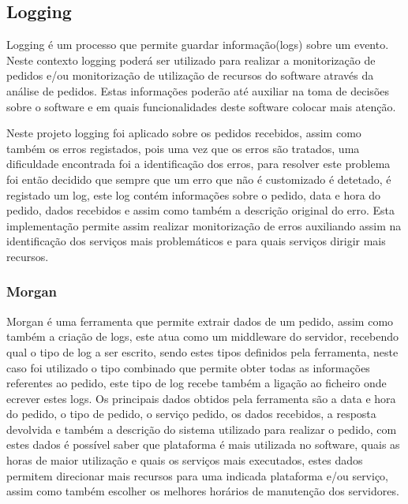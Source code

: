 \subsection{Logging}
Logging é um processo que permite guardar informação(logs) sobre um evento. Neste contexto logging poderá ser utilizado para realizar a monitorização de pedidos e/ou monitorização de utilização de recursos do software através da análise de pedidos. Estas informações poderão até auxiliar na toma de decisões sobre o software e em quais funcionalidades deste software colocar mais atenção.

Neste projeto logging foi aplicado sobre os pedidos recebidos, assim como também os erros registados, pois uma vez que os erros são tratados, uma dificuldade encontrada foi a identificação dos erros, para resolver este problema foi então decidido que sempre que um erro que não é customizado é detetado, é registado um log, este log contém informações sobre o pedido, data e hora do pedido, dados recebidos e assim como também a descrição original do erro. Esta implementação permite assim realizar monitorização de erros auxiliando assim na identificação dos serviços mais problemáticos e para quais serviços dirigir mais recursos.

\subsubsection{Morgan}
Morgan é uma ferramenta que permite extrair dados de um pedido, assim como também a criação de logs, 
este atua como um middleware do servidor, recebendo qual o tipo de log a ser escrito, sendo estes tipos definidos pela ferramenta, neste caso foi utilizado o tipo combinado que permite obter todas as informações referentes ao pedido, este tipo de log recebe também a ligação ao ficheiro onde ecrever estes logs. Os principais dados obtidos pela ferramenta são a data e hora do pedido, o tipo de pedido, o serviço pedido, os dados recebidos, a resposta devolvida e também a descrição do sistema utilizado para realizar o pedido, com estes dados é possível saber que plataforma é mais utilizada no software, quais as horas de maior utilização e quais os serviços mais executados, estes dados permitem direcionar mais recursos para uma indicada plataforma e/ou serviço, assim como também escolher os melhores horários de manutenção dos servidores.